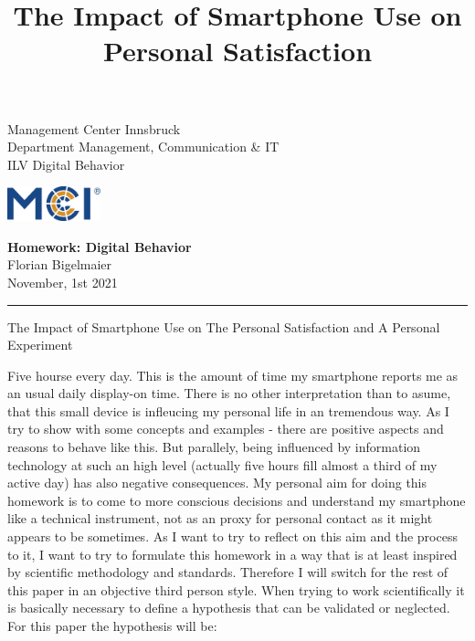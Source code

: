 \documentclass[11pt,letterpaper]{article}
\newcommand{\fontsmall}{\fontsize{7pt}{10pt}\selectfont}
\newcommand{\fontnormal}{\fontsize{11pt}{16pt}\selectfont}
\newcommand{\headline}{\fontsize{17pt}{26pt}\selectfont}
\begin{document}
   \title{The Impact of Smartphone Use on Personal Satisfaction} 



\noindent\begin{minipage}{0.5\textwidth}
\fontsmall
Management Center Innsbruck \\
Department Management, Communication \& IT  \\
ILV Digital Behavior


\end{minipage}%
\hfill%
\begin{minipage}{0.3\textwidth}\raggedleft
\includegraphics[height=1.0cm]{mci-logo.png}

\end{minipage}


 
\begin{center}
\textbf{Homework: Digital Behavior}\\   %
Florian Bigelmaier\\                         %
November, 1st 2021\\                         %
\end{center}
\rule{\linewidth}{0.1mm}




\headline \begin{center}
The Impact of Smartphone Use on The Personal Satisfaction and A Personal Experiment
\end{center} 
\fontnormal 
Five hourse every day. This is the amount of time my smartphone reports me as an usual daily display-on time. There is no other interpretation than to asume, that this small device is infleucing my personal life in an tremendous way. As I try to show with some concepts and examples - there are positive aspects and reasons to behave like this. But parallely, being influenced by information technology at such an high level (actually five hours fill almost a third of my active day) has also negative consequences. My personal aim for doing this homework is to come to more conscious decisions and understand my smartphone like a technical instrument, not as an proxy for personal contact as it might appears to be sometimes. As I want to try to reflect on this aim and the process to it, I want to try to formulate this homework in a way that is at least inspired by scientific methodology and standards. Therefore I will switch for the rest of this paper in an objective third person style. When trying to work scientifically it is basically necessary to define a hypothesis that can be validated or neglected. For this paper the hypothesis will be:
\end{document}

